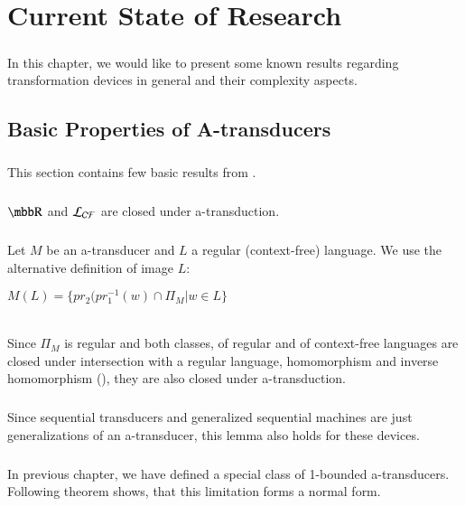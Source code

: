 \chapter{Current State of Research}
\label{chap:currentState}

\paragraph{}
In this chapter, we would like to present some known results regarding transformation devices in general and their complexity aspects.

\section{Basic Properties of A-transducers}
\paragraph{}
This section contains few basic results from \cite{gin:AATPFL}.

\paragraph{}
\clema $\R $ and $\CF $ are closed under a-transduction.

\paragraph{}
\dokaz Let $M$ be an a-transducer and $L$ a regular (context-free) language. We use the alternative definition of image $L$:\\
\centerline{$M(L) = \{ pr_{2}(pr_{1}^{-1}(w) \cap \Pi_{M} | w \in L \}$} \\
Since $\Pi_{M}$ is regular and both classes, of regular and of context-free languages are closed under intersection with a regular language, homomorphism and inverse homomorphism (\cite{hopcroft:fola}), they are also closed under a-transduction. \square

\paragraph{}
\cdosledok Since sequential transducers and generalized sequential machines are just generalizations of an a-transducer, this lemma also holds for these devices.

\paragraph{}
In previous chapter, we have defined a special class of 1-bounded a-transducers. Following theorem shows, that this limitation forms a normal form.

